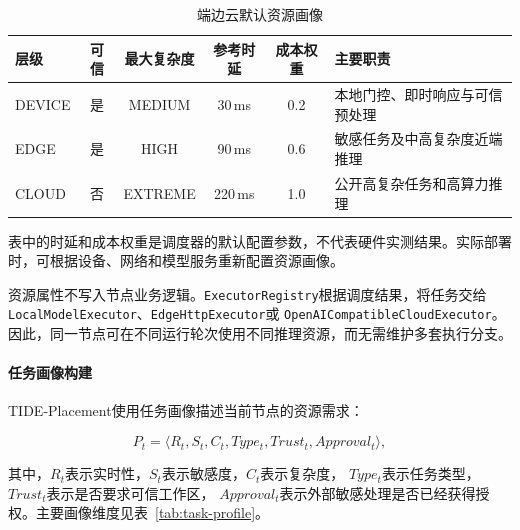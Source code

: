 \begin{table}[htbp]
    \centering
    \caption{端边云默认资源画像}
    \label{tab:resource-profile}
    \begin{tabularx}{\textwidth}{l c c c c X}
        \toprule
        层级 & 可信 & 最大复杂度 & 参考时延 & 成本权重 & 主要职责 \\
        \midrule
        DEVICE & 是 & MEDIUM & 30\,ms & 0.2
        & 本地门控、即时响应与可信预处理 \\

        EDGE & 是 & HIGH & 90\,ms & 0.6
        & 敏感任务及中高复杂度近端推理 \\

        CLOUD & 否 & EXTREME & 220\,ms & 1.0
        & 公开高复杂任务和高算力推理 \\
        \bottomrule
    \end{tabularx}
\end{table}


表中的时延和成本权重是调度器的默认配置参数，不代表硬件实测结果。实际部署时，可根据设备、网络和模型服务重新配置资源画像。

资源属性不写入节点业务逻辑。\texttt{ExecutorRegistry}根据调度结果，将任务交给
\texttt{LocalModelExecutor}、\texttt{EdgeHttpExecutor}或
\texttt{OpenAICompatibleCloudExecutor}。因此，同一节点可在不同运行轮次使用不同推理资源，而无需维护多套执行分支。

\paragraph{任务画像构建}

TIDE-Placement使用任务画像描述当前节点的资源需求：

\[
P_t=\langle R_t,S_t,C_t,Type_t,Trust_t,Approval_t\rangle,
\]

其中，\(R_t\)表示实时性，\(S_t\)表示敏感度，\(C_t\)表示复杂度，
\(Type_t\)表示任务类型，\(Trust_t\)表示是否要求可信工作区，
\(Approval_t\)表示外部敏感处理是否已经获得授权。主要画像维度见表~\ref{tab:task-profile}。

